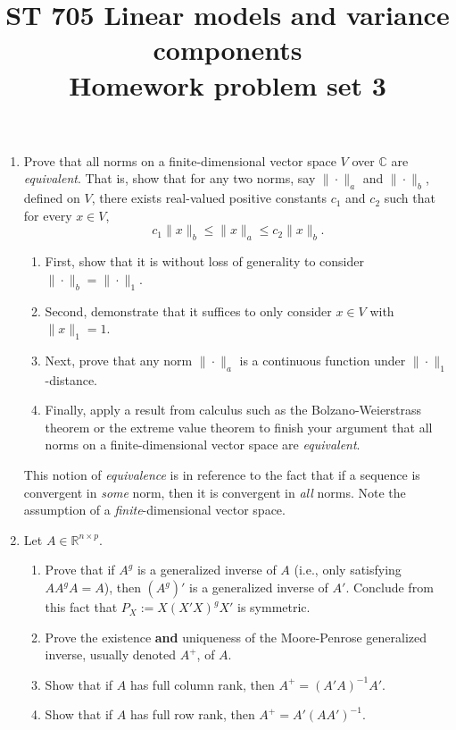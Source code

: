 \documentclass[11pt]{article}
\title{ST 705 Linear models and variance components \\ 
        Homework problem set 3}
\begin{document}
\maketitle

\begin{enumerate}

\item Prove that all norms on a finite-dimensional vector space $V$ over $\mathbb{C}$ are {\em equivalent}.  That is, show that for any two norms, say $\|\cdot\|_{a}$ and $\|\cdot\|_{b}$, defined on $V$, there exists real-valued positive constants $c_{1}$ and $c_{2}$ such that for every $x \in V$,
\[
c_{1}\|x\|_{b} \le \|x\|_{a} \le c_{2}\|x\|_{b}.
\]
\begin{enumerate}
\item First, show that it is without loss of generality to consider $\|\cdot\|_{b} = \|\cdot\|_{1}$.
\item Second, demonstrate that it suffices to only consider $x \in V$ with $\|x\|_{1} = 1$.
\item Next, prove that any norm $\|\cdot\|_{a}$ is a continuous function under $\|\cdot\|_{1}$-distance.
\item Finally, apply a result from calculus such as the Bolzano-Weierstrass theorem or the extreme value theorem to finish your argument that all norms on a finite-dimensional vector space are {\em equivalent}.
\end{enumerate}
This notion of {\em equivalence} is in reference to the fact that if a sequence is convergent in {\em some} norm, then it is convergent in {\em all} norms.  Note the assumption of a {\em finite}-dimensional vector space.

\item Let $A \in \mathbb{R}^{n\times p}$.
\begin{enumerate}
\item Prove that if $A^{g}$ is a generalized inverse of $A$ (i.e., only satisfying $AA^{g}A = A$), then $(A^{g})'$ is a generalized inverse of $A'$.  Conclude from this fact that $P_{X} := X(X'X)^{g}X'$ is symmetric.
\item Prove the existence \textbf{and} uniqueness of the Moore-Penrose generalized inverse, usually denoted $A^{+}$, of $A$.
\item Show that if $A$ has full column rank, then $A^{+} = (A'A)^{-1}A'$.  
\item Show that if $A$ has full row rank, then $A^{+} = A'(AA')^{-1}$.
\end{enumerate}


\end{enumerate}
\end{document}
